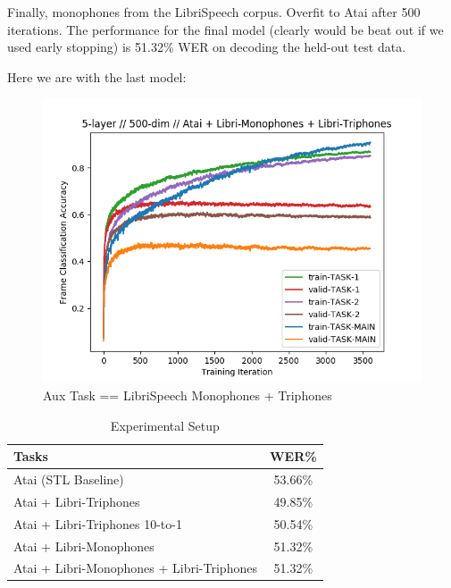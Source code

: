 \documentclass[a4paper]{article}
\begin{document}
Finally, monophones from the LibriSpeech corpus. Overfit to Atai after 500 iterations. The performance for the final model (clearly would be beat out if we used early stopping) is 51.32\% WER on decoding the held-out test data.



Here we are with the last model:


\begin{figure}[!htb]
  \centering
{}
  \includegraphics[width=\linewidth]{figs/atai-libritriphones-librimonophones.png}
  \caption{Aux Task == LibriSpeech Monophones + Triphones}
\endminipage\hfill
\end{figure}






\begin{table}[!htbp]
  \centering
  \begin{adjustbox}{width=.45\textwidth}
    \begin{tabular}{lc}
      \toprule
      \textbf{Tasks} & \textbf{WER\%}\\
      \midrule
      Atai (STL Baseline) &  53.66\% \\
      Atai + Libri-Triphones & 49.85\%  \\
      Atai + Libri-Triphones 10-to-1 & 50.54\%  \\
      Atai + Libri-Monophones &  51.32\% \\
      Atai + Libri-Monophones + Libri-Triphones & 51.32\%  \\
      \bottomrule
    \end{tabular}
    \label{table:data}
  \end{adjustbox}
  
  \caption{Experimental Setup}
  
\end{table}
\end{document}

